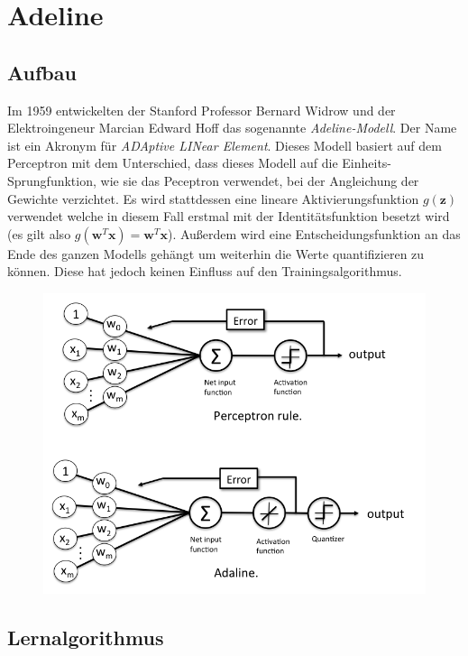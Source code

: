 \section{Adeline} \label{sc:adel}

\subsection{Aufbau}

Im 1959 entwickelten der Stanford Professor Bernard Widrow und der Elektroingeneur Marcian Edward Hoff das sogenannte \emph{Adeline-Modell}. Der Name ist ein Akronym für \emph{ADAptive LINear Element}. Dieses Modell basiert auf dem Perceptron mit dem Unterschied, dass dieses Modell auf die Einheits-Sprungfunktion, wie sie das Peceptron verwendet, bei der Angleichung der Gewichte verzichtet. Es wird stattdessen eine lineare Aktivierungsfunktion ${g(\mathbf{z})}$ verwendet welche in diesem Fall erstmal mit der Identitätsfunktion besetzt wird (es gilt also ${g(\mathbf{w}^T\mathbf{x}) = \mathbf{w}^T\mathbf{x}}$). Außerdem wird eine Entscheidungsfunktion an das Ende des ganzen Modells gehängt um weiterhin die Werte quantifizieren zu können. Diese hat jedoch keinen Einfluss auf den Trainingsalgorithmus. 

\begin{figure}[!htb]
	\centering
	\includegraphics[width=.8\linewidth]{img/adeline_aufbau}
	\label{fig:ad_aufbau}
\end{figure}


\subsection{Lernalgorithmus} \label{ss:la}

